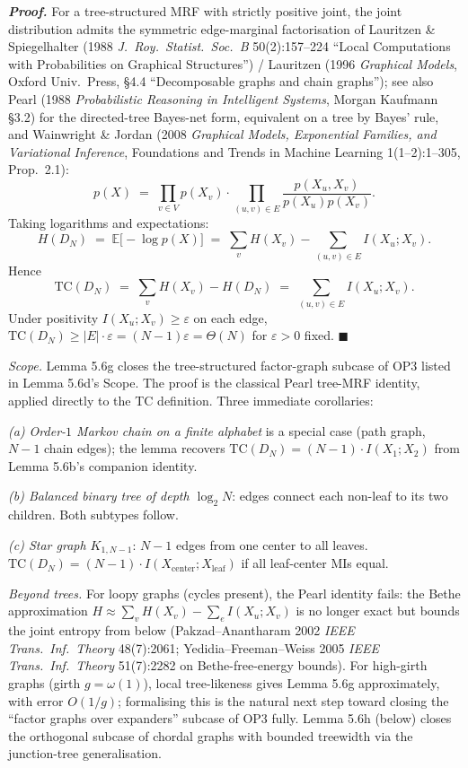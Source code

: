 \documentclass[
]{article}
\begin{document}
\emph{\textbf{Proof.}} For a tree-structured MRF with strictly
positive joint, the joint distribution admits the symmetric
edge-marginal factorisation of Lauritzen \& Spiegelhalter (1988
\emph{J.\ Roy.\ Statist.\ Soc.\ B} 50(2):157--224 ``Local Computations
with Probabilities on Graphical Structures'') / Lauritzen (1996
\emph{Graphical Models}, Oxford Univ.\ Press, §4.4 ``Decomposable
graphs and chain graphs''); see also Pearl (1988
\emph{Probabilistic Reasoning in Intelligent Systems}, Morgan
Kaufmann §3.2) for the directed-tree Bayes-net form, equivalent on
a tree by Bayes' rule, and Wainwright \& Jordan (2008
\emph{Graphical Models, Exponential Families, and Variational
Inference}, Foundations and Trends in Machine Learning
1(1--2):1--305, Prop.\ 2.1):
\[
p(X) \;=\; \prod_{v \in V} p(X_v) \cdot \prod_{(u, v) \in E}
\frac{p(X_u, X_v)}{p(X_u) p(X_v)}.
\]
Taking logarithms and expectations:
\[
H(D_N)
\;=\; \mathbb{E}\bigl[-\log p(X)\bigr]
\;=\; \sum_v H(X_v) - \sum_{(u, v) \in E} I(X_u; X_v).
\]
Hence
\[
\mathrm{TC}(D_N) \;=\; \sum_v H(X_v) - H(D_N)
\;=\; \sum_{(u, v) \in E} I(X_u; X_v).
\]
Under positivity $I(X_u; X_v) \geq \varepsilon$ on each edge,
$\mathrm{TC}(D_N) \geq |E| \cdot \varepsilon = (N - 1) \varepsilon =
\Theta(N)$ for $\varepsilon > 0$ fixed.
\hfill$\blacksquare$

\emph{Scope.} Lemma 5.6g closes the tree-structured factor-graph
subcase of OP3 listed in Lemma 5.6d's Scope. The proof is the
classical Pearl tree-MRF identity, applied directly to the TC
definition. Three immediate corollaries:

\emph{(a) Order-$1$ Markov chain on a finite alphabet} is a special
case (path graph, $N - 1$ chain edges); the lemma recovers
$\mathrm{TC}(D_N) = (N - 1) \cdot I(X_1; X_2)$ from Lemma 5.6b's
companion identity.

\emph{(b) Balanced binary tree of depth $\log_2 N$}: edges connect
each non-leaf to its two children. Both subtypes follow.

\emph{(c) Star graph $K_{1, N-1}$}: $N - 1$ edges from one center
to all leaves. $\mathrm{TC}(D_N) = (N - 1) \cdot I(X_{\mathrm{center}};
X_{\mathrm{leaf}})$ if all leaf-center MIs equal.

\emph{Beyond trees.} For loopy graphs (cycles present), the
Pearl identity fails: the Bethe approximation
$H \approx \sum_v H(X_v) - \sum_e I(X_u; X_v)$ is no longer exact
but bounds the joint entropy from below (Pakzad--Anantharam 2002
\emph{IEEE Trans.\ Inf.\ Theory} 48(7):2061; Yedidia--Freeman--Weiss
2005 \emph{IEEE Trans.\ Inf.\ Theory} 51(7):2282 on Bethe-free-energy
bounds). For high-girth graphs (girth $g = \omega(1)$), local
tree-likeness gives Lemma 5.6g approximately, with error $O(1/g)$;
formalising this is the natural next step toward closing the
``factor graphs over expanders'' subcase of OP3 fully. Lemma 5.6h
(below) closes the orthogonal subcase of chordal graphs with bounded
treewidth via the junction-tree generalisation.
\end{document}
